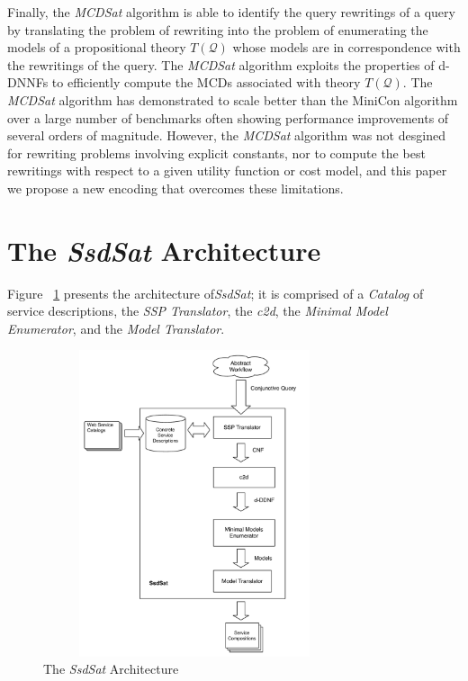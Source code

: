 \documentclass{llncs}
\newcommand{\Q}{\mathcal{Q}}
\newcommand{\Theory}[1]{T(#1)}
\begin{document}
\begin{description}
Finally,  the
{\it MCDSat} algorithm is able to identify the query rewritings of a query by translating the problem of rewriting
into the problem of enumerating the models of a propositional
theory  $\Theory{\Q}$ whose models are in correspondence
with the rewritings of the query. 
The {\it MCDSat} algorithm exploits the properties of d-DNNFs to efficiently 
compute the MCDs associated with theory $\Theory{\Q}$.
The  {\it MCDSat} algorithm has demonstrated to scale better than the MiniCon
algorithm over a large number of benchmarks often showing performance
improvements of several orders of magnitude. However, the {\it MCDSat} algorithm was not desgined for rewriting problems involving explicit constants,
nor to compute the best rewritings with respect to a given utility function or cost model, and this paper we propose a new encoding  that overcomes these limitations.


\end{description}

\section{The {\it SsdSat} Architecture}
Figure ~\ref{fig:architecture} presents the architecture of{\it SsdSat}; it is comprised of a {\it Catalog} of service descriptions, the {\it SSP Translator},  the {\it c2d}, the {\it Minimal Model Enumerator}, and the {\it Model Translator}.   

\begin{figure}
\centering
\includegraphics[height=90mm,width=3.5in]{mdcsatC.pdf}
\caption{The {\it SsdSat} Architecture}
\label{fig:architecture}
\end{figure}
\end{document}
